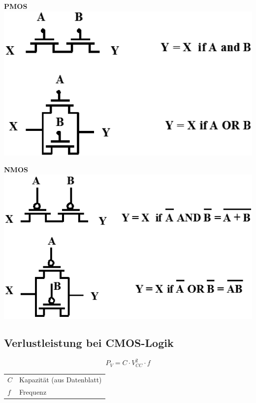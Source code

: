 \begin{minipage}[c]{0.45\columnwidth}
    \begin{center}
        \textbf{PMOS} \\
        \includegraphics[width=\columnwidth]{images/nmos_dualitaet.png}
    \end{center}
\end{minipage}
\hfill
\begin{minipage}[c]{0.45\columnwidth}
    \begin{center}
        \textbf{NMOS} \\
        \includegraphics[width=\columnwidth]{images/pmos_dualitaet.png}
    \end{center}
\end{minipage}


\subsection{Verlustleistung bei CMOS-Logik}

\begin{minipage}[c]{0.48\columnwidth}
    $$ \boxed{ P_V = C \cdot V_{CC}^2 \cdot f} $$
\end{minipage}
\hfill
\begin{minipage}[c]{0.48\columnwidth}
    \begin{tabular}{ll}
        $C$ & Kapazität (aus Datenblatt) \\
        $f$ & Frequenz 
    \end{tabular}
\end{minipage}


